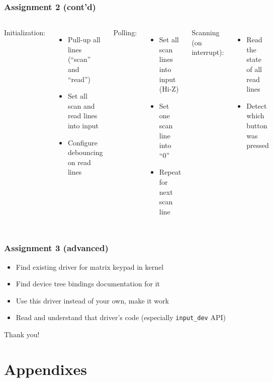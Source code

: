 \documentclass[aspectratio=169,usenames,dvipsnames]{beamer}
\newcounter{cont}
\begin{document}
\begin{frame}
  \frametitle{Assignment 2 (cont'd)}
  \begin{columns}
      Initialization:
      \begin{itemize}
        \item Pull-up all lines (``scan'' and ``read'')
        \item Set all scan and read lines into input
        \item Configure debouncing on read lines
      \end{itemize}
      Polling:
      \begin{itemize}
        \item Set all scan lines into input (Hi-Z)
        \item Set one scan line into ``0''
        \item Repeat for next scan line
      \end{itemize}
      Scanning (on interrupt):
      \begin{itemize}
        \item Read the state of all read lines
        \item Detect which button was pressed
      \end{itemize}
  \end{columns}
\end{frame}

\begin{frame}
  \frametitle{Assignment 3 (advanced)}
  \begin{itemize}
    \item Find existing driver for matrix keypad in kernel
    \item Find device tree bindings documentation for it
    \item Use this driver instead of your own, make it work
    \item Read and understand that driver's code (especially
          \texttt{input\_dev} API)
  \end{itemize}
\end{frame}

\begin{frame}[standout]
  Thank you!
\end{frame}

\section{Appendixes}
\end{document}
